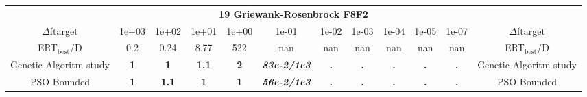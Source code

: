 \begin{tabular}{cccccccccccc}
 & \multicolumn{10}{c}{{\normalsize \textbf{19 Griewank-Rosenbrock F8F2}}}\\
$\Delta$ftarget& 1e+03& 1e+02& 1e+01& 1e+00& 1e-01& 1e-02& 1e-03& 1e-04& 1e-05& 1e-07 & $\Delta$ftarget \\
ERT$_{\textrm{best}}$/D& 0.2& 0.24& 8.77& 522& nan& nan& nan& nan& nan& nan & ERT$_{\textrm{best}}$/D \\
\hline
Genetic Algoritm study & \textbf{1} & \textbf{1} & \textbf{1.1} & \textbf{2} & \textbf{\textit{83e-2}\textit{/1e3}} & \textbf{.} & \textbf{.} & \textbf{.} & \textbf{.} & \textbf{.} & Genetic Algoritm study \cite{add_an_entry_for_Genetic Algoritm study_in_bbob.bib}\\
PSO Bounded & \textbf{1} & \textbf{1.1} & \textbf{1} & \textbf{1} & \textbf{\textit{56e-2}\textit{/1e3}} & \textbf{.} & \textbf{.} & \textbf{.} & \textbf{.} & \textbf{.} & PSO Bounded \cite{add_an_entry_for_PSO Bounded_in_bbob.bib}
\end{tabular}
